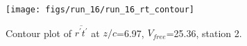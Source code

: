 \begin{figure}[H]
\centering
\texttt{[image: figs/run\_16/run\_16\_rt\_contour]}
\caption{Contour plot of $\overline{r^\prime t^\prime}$ at $z/c$=6.97, $V_{free}$=25.36, station 2.}
\label{fig:run_16_rt_contour}
\end{figure}


